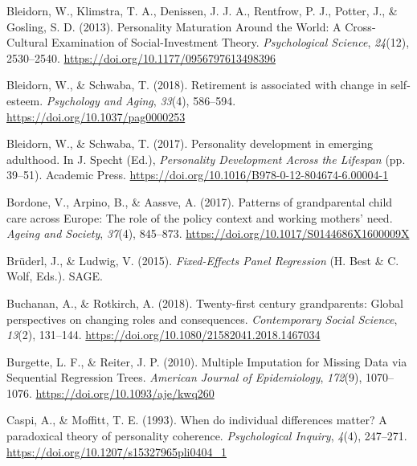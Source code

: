 \documentclass[
  english,
  man,floatsintext]{apa7}
\begin{document}
\leavevmode\hypertarget{ref-bleidornPersonalityMaturationWorld2013}{}%
Bleidorn, W., Klimstra, T. A., Denissen, J. J. A., Rentfrow, P. J., Potter, J., \& Gosling, S. D. (2013). Personality Maturation Around the World: A Cross-Cultural Examination of Social-Investment Theory. \emph{Psychological Science}, \emph{24}(12), 2530--2540. \url{https://doi.org/10.1177/0956797613498396}

\leavevmode\hypertarget{ref-bleidornRetirementAssociatedChange2018}{}%
Bleidorn, W., \& Schwaba, T. (2018). Retirement is associated with change in self-esteem. \emph{Psychology and Aging}, \emph{33}(4), 586--594. \url{https://doi.org/10.1037/pag0000253}

\leavevmode\hypertarget{ref-bleidornPersonalityDevelopmentEmerging2017}{}%
Bleidorn, W., \& Schwaba, T. (2017). Personality development in emerging adulthood. In J. Specht (Ed.), \emph{Personality Development Across the Lifespan} (pp. 39--51). Academic Press. \url{https://doi.org/10.1016/B978-0-12-804674-6.00004-1}

\leavevmode\hypertarget{ref-bordonePatternsGrandparentalChild2017}{}%
Bordone, V., Arpino, B., \& Aassve, A. (2017). Patterns of grandparental child care across Europe: The role of the policy context and working mothers' need. \emph{Ageing and Society}, \emph{37}(4), 845--873. \url{https://doi.org/10.1017/S0144686X1600009X}

\leavevmode\hypertarget{ref-bruderlFixedEffectsPanelRegression2015}{}%
Brüderl, J., \& Ludwig, V. (2015). \emph{Fixed-Effects Panel Regression} (H. Best \& C. Wolf, Eds.). SAGE.

\leavevmode\hypertarget{ref-buchananTwentyfirstCenturyGrandparents2018}{}%
Buchanan, A., \& Rotkirch, A. (2018). Twenty-first century grandparents: Global perspectives on changing roles and consequences. \emph{Contemporary Social Science}, \emph{13}(2), 131--144. \url{https://doi.org/10.1080/21582041.2018.1467034}

\leavevmode\hypertarget{ref-burgetteMultipleImputationMissing2010}{}%
Burgette, L. F., \& Reiter, J. P. (2010). Multiple Imputation for Missing Data via Sequential Regression Trees. \emph{American Journal of Epidemiology}, \emph{172}(9), 1070--1076. \url{https://doi.org/10.1093/aje/kwq260}

\leavevmode\hypertarget{ref-caspiWhenIndividualDifferences1993}{}%
Caspi, A., \& Moffitt, T. E. (1993). When do individual differences matter? A paradoxical theory of personality coherence. \emph{Psychological Inquiry}, \emph{4}(4), 247--271. \url{https://doi.org/10.1207/s15327965pli0404_1}
\end{document}
